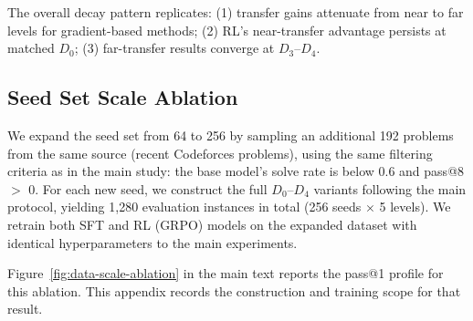 \documentclass[]{bytedance_seed}
\theoremstyle{plain}
\theoremstyle{definition}
\theoremstyle{remark}
\begin{document}
\begin{table}[h]
\centering
\small
\caption{DeepSeek-R1-Distill-Llama-8B across the Generalization Spectrum. $\text{Gain}_n$ columns report normalized gains, AUS reports average raw transfer gain, and $\text{N-F}_n$ reports the normalized near-far gap. Format follows Table~\ref{tab:main_results}.}
\label{tab:llama-spectrum}
\end{table}

The overall decay pattern replicates: (1) transfer gains attenuate from near to far levels for gradient-based methods; (2) RL's near-transfer advantage persists at matched $D_0$; (3) far-transfer results converge at $D_3$--$D_4$.


\subsection{Seed Set Scale Ablation}
\label{app:ablation-seed-scale}

We expand the seed set from 64 to 256 by sampling an additional 192 problems from the same source (recent Codeforces problems), using the same filtering criteria as in the main study: the base model's solve rate is below 0.6 and pass@8 $>$ 0. For each new seed, we construct the full $D_0$--$D_4$ variants following the main protocol, yielding 1,280 evaluation instances in total (256 seeds $\times$ 5 levels). We retrain both SFT and RL (GRPO) models on the expanded dataset with identical hyperparameters to the main experiments.

Figure~\ref{fig:data-scale-ablation} in the main text reports the pass@1 profile for this ablation. This appendix records the construction and training scope for that result.
\end{document}
